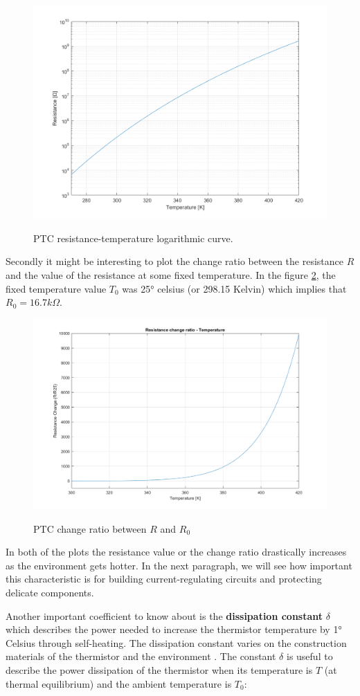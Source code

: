 \begin{figure}[h]
    \centering
    \includegraphics[width = .7\textwidth]{../res/plots/PTC_logarithmic.png}
    \label{fig:PTC_logarithmic}
    \caption{PTC resistance-temperature logarithmic curve.}
\end{figure}

\FloatBarrier\noindent Secondly it might be interesting to plot the change ratio between the resistance $R$ and the value of the resistance at some fixed temperature. In the figure \ref{fig:PTC_ratio}, the fixed temperature value $T_0$ was 25° celsius (or 298.15 Kelvin) which implies that $R_0 = 16.7 k\Omega$.

\begin{figure}[h]
    \centering
    \includegraphics[width = .7\textwidth]{../res/plots/PTC_ratio.png}
    \label{fig:PTC_ratio}
    \caption{PTC change ratio between $R$ and $R_0$}
\end{figure}

\FloatBarrier\noindent In both of the plots the resistance value or the change ratio drastically increases as the environment gets hotter. In the next paragraph, we will see how important this characteristic is for building current-regulating circuits and protecting delicate components.

Another important coefficient to know about is the \textbf{dissipation constant} $\delta$ which describes the power needed to increase the thermistor temperature by 1° Celsius through self-heating. The dissipation constant varies on the construction materials of the thermistor and the environment \cite{Saburi196353}. The constant $\delta$ is useful to describe the power dissipation of the thermistor when its temperature is $T$ (at thermal equilibrium) and the ambient temperature is $T_0$:

